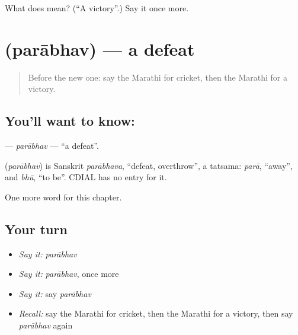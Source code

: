 \begin{tcolorbox}[breakable,colback=teal!4,colframe=teal!35!black,title={Before you move on}]
What does  mean? (\textquotedblleft{}A victory\textquotedblright{}.) Say it once more.
\end{tcolorbox}
\section[\texorpdfstring{\mr{पराभव} (parābhav)}{पराभव (parābhav)}]{ (parābhav) — a defeat}

\label{lesson:MR-C185-parabhav}



\begin{quote}
Before the new one: say the Marathi for cricket, then the Marathi for a victory.
\end{quote}

\subsection*{You'll want to know: }
\textbf{} — \emph{parābhav} — \textquotedblleft{}a defeat\textquotedblright{}.

\begin{cousinweb}
\textbf{} (\emph{parābhav}) is Sanskrit \emph{parābhava}, \textquotedblleft{}defeat, overthrow\textquotedblright{}, a tatsama: \emph{parā}, \textquotedblleft{}away\textquotedblright{}, and \emph{bhū}, \textquotedblleft{}to be\textquotedblright{}. CDIAL has no entry for it.
\end{cousinweb}

\begin{grammarlens}[title={What you've built}]
One more word for this chapter.
\end{grammarlens}

\subsection*{Your turn}
\begin{itemize}
\raggedright
  \item \emph{Say it:} \emph{parābhav}
  \item \emph{Say it:} \emph{parābhav}, once more
  \item \emph{Say it:} say \emph{parābhav}
  \item \emph{Recall:} say the Marathi for cricket, then the Marathi for a victory, then say \emph{parābhav} again
\end{itemize}

